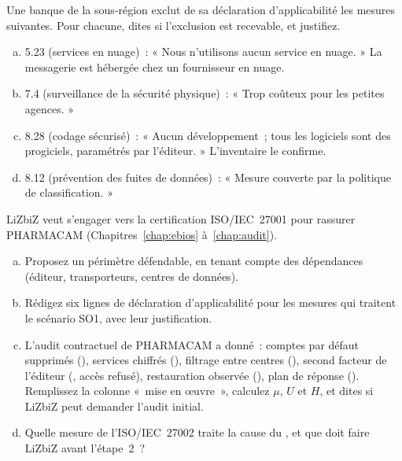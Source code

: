 \begin{boxexo}[title={\ding{45}\quad Exercice~8.3. Quatre exclusions \niveaumoyen}]
Une banque de la sous-région exclut de sa déclaration d'applicabilité les
mesures suivantes. Pour chacune, dites si l'exclusion est recevable, et
justifiez.
\begin{enumerate}[(a)]
    \item 5.23 (services en nuage)~: « Nous n'utilisons aucun service en
          nuage. » La messagerie est hébergée chez un fournisseur en nuage.
    \item 7.4 (surveillance de la sécurité physique)~: « Trop coûteux pour
          les petites agences. »
    \item 8.28 (codage sécurisé)~: « Aucun développement~; tous les logiciels
          sont des progiciels, paramétrés par l'éditeur. » L'inventaire le
          confirme.
    \item 8.12 (prévention des fuites de données)~: « Mesure couverte par la
          politique de classification. »
\end{enumerate}
\end{boxexo}

\begin{boxexo}[title={\ding{45}\quad Exercice~8.4. La déclaration de LiZbiZ \niveauexpert}]
LiZbiZ veut s'engager vers la certification ISO/IEC~27001 pour rassurer
PHARMACAM (Chapitres~\ref{chap:ebios} à~\ref{chap:audit}).
\begin{enumerate}[(a)]
    \item Proposez un périmètre défendable, en tenant compte des
          dépendances (éditeur, transporteurs, centres de données).
    \item Rédigez six lignes de déclaration d'applicabilité pour les mesures
          qui traitent le scénario SO1, avec leur justification.
    \item L'audit contractuel de PHARMACAM a donné~: comptes par défaut
          supprimés (\OUI{}), services chiffrés (\OUI{}), filtrage entre
          centres (\NON{}), second facteur de l'éditeur (\NEK{}, accès
          refusé), restauration observée (\OUI{}), plan de réponse
          (\NON{}). Remplissez la colonne «~mise en œuvre~», calculez $\mu$,
          $U$ et $H$, et dites si LiZbiZ peut demander l'audit initial.
    \item Quelle mesure de l'ISO/IEC~27002 traite la cause du \NEK{}, et que
          doit faire LiZbiZ avant l'étape~2~?
\end{enumerate}
\end{boxexo}

